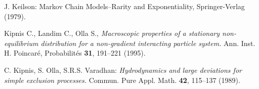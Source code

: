 \documentclass[reqno]{amsart}
\begin{document}
\begin{thebibliography}{99}
 J. Keilson: Markov Chain Models--Rarity and
    Exponentiality, Springer-Verlag (1979). 

 Kipnis C., Landim C., Olla S., \emph{Macroscopic
    properties of a stationary non-equilibrium distribution for a
    non-gradient interacting particle system.}  Ann. Inst. H.
  Poincar\'e, Probabilit\'es {\bf 31}, 191--221 (1995).

 C. Kipnis, S. Olla, S.R.S. Varadhan: \emph{Hydrodynamics
    and large deviations for simple exclusion processes.}  Commun.
  Pure Appl. Math. {\bf 42}, 115--137 (1989).

\end{thebibliography}
\end{document}
